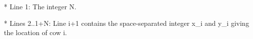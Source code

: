 * Line 1: The integer N. 

* Lines 2..1+N: Line i+1 contains the space-separated integer x\_i and         y\_i giving the location of cow i.